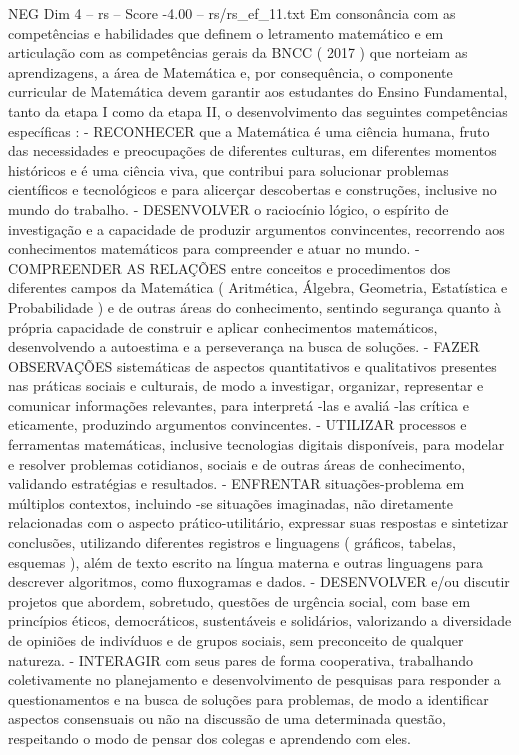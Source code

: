 \begin{textsample}{NEG Dim 4 – rs – Score -4.00 – rs/rs\_ef\_11.txt}
Em consonância com as competências e habilidades que definem o letramento matemático e em articulação com as competências gerais da BNCC ( 2017 ) que norteiam as aprendizagens, a área de Matemática e, por consequência, o componente curricular de Matemática devem garantir aos estudantes do Ensino Fundamental, tanto da etapa I como da etapa II, o desenvolvimento das seguintes competências específicas : - RECONHECER que a Matemática é uma ciência humana, fruto das necessidades e preocupações de diferentes culturas, em diferentes momentos históricos e é uma ciência viva, que contribui para solucionar problemas científicos e tecnológicos e para alicerçar descobertas e construções, inclusive no mundo do trabalho. - DESENVOLVER o raciocínio lógico, o espírito de investigação e a capacidade de produzir argumentos convincentes, recorrendo aos conhecimentos matemáticos para compreender e atuar no mundo. - COMPREENDER AS RELAÇÕES entre conceitos e procedimentos dos diferentes campos da Matemática ( Aritmética, Álgebra, Geometria, Estatística e Probabilidade ) e de outras áreas do conhecimento, sentindo segurança quanto à própria capacidade de construir e aplicar conhecimentos matemáticos, desenvolvendo a autoestima e a perseverança na busca de soluções. - FAZER OBSERVAÇÕES sistemáticas de aspectos quantitativos e qualitativos presentes nas práticas sociais e culturais, de modo a investigar, organizar, representar e comunicar informações relevantes, para interpretá -las e avaliá -las crítica e eticamente, produzindo argumentos convincentes. - UTILIZAR processos e ferramentas matemáticas, inclusive tecnologias digitais disponíveis, para modelar e resolver problemas cotidianos, sociais e de outras áreas de conhecimento, validando estratégias e resultados. - ENFRENTAR situações-problema em múltiplos contextos, incluindo -se situações imaginadas, não diretamente relacionadas com o aspecto prático-utilitário, expressar suas respostas e sintetizar conclusões, utilizando diferentes registros e linguagens ( gráficos, tabelas, esquemas ), além de texto escrito na língua materna e outras linguagens para descrever algoritmos, como fluxogramas e dados. - DESENVOLVER e/ou discutir projetos que abordem, sobretudo, questões de urgência social, com base em princípios éticos, democráticos, sustentáveis e solidários, valorizando a diversidade de opiniões de indivíduos e de grupos sociais, sem preconceito de qualquer natureza. - INTERAGIR com seus pares de forma cooperativa, trabalhando coletivamente no planejamento e desenvolvimento de pesquisas para responder a questionamentos e na busca de soluções para problemas, de modo a identificar aspectos consensuais ou não na discussão de uma determinada questão, respeitando o modo de pensar dos colegas e aprendendo com eles.

\end{textsample}
